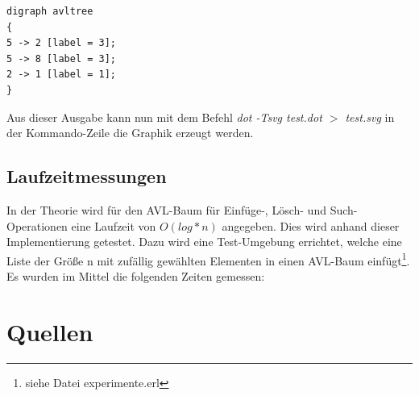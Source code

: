 \documentclass{article}
\begin{document}
\begin{lstlisting}
digraph avltree
{
5 -> 2 [label = 3];
5 -> 8 [label = 3];
2 -> 1 [label = 1];
}
\end{lstlisting}

	Aus dieser Ausgabe kann nun mit dem Befehl \textit{dot -Tsvg test.dot $>$ test.svg} in der Kommando-Zeile die Graphik erzeugt werden.
	
	\newpage
	\subsection{Laufzeitmessungen}
	In der Theorie wird für den AVL-Baum für Einfüge-, Lösch- und Such-Operationen eine Laufzeit von $O(log*n)$ angegeben. Dies wird anhand dieser Implementierung getestet. Dazu wird eine Test-Umgebung errichtet, welche eine Liste der Größe n mit zufällig gewählten Elementen in einen AVL-Baum einfügt\footnote{siehe Datei experimente.erl}. Es wurden im Mittel die folgenden Zeiten gemessen:
	
  	\newpage
  	\section{Quellen}
\end{document}
